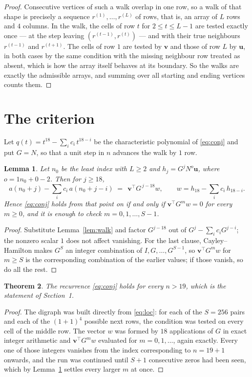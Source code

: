 \documentclass[11pt,a4paper]{article}
\theoremstyle{plain}
\newtheorem{theorem}{Theorem}
\newtheorem{lemma}[theorem]{Lemma}
\theoremstyle{definition}
\begin{document}
\begin{proof}
Consecutive vertices of such a walk overlap in one row, so a walk of that shape is
precisely a sequence $r^{(1)},\dots,r^{(L)}$ of rows, that is, an array of $L$ rows
and $4$ columns. In the walk, the cells of row $t$ for $2\le t\le L-1$ are tested
exactly once --- at the step leaving $(r^{(t-1)},r^{(t)})$ --- and with their true
neighbours $r^{(t-1)}$ and $r^{(t+1)}$. The cells of row $1$ are tested by
$\mathbf{v}$ and those of row $L$ by $\mathbf{u}$, in both cases by the same condition
with the missing neighbour row treated as absent, which is how the array itself behaves at
its boundary. So the walks are exactly the admissible arrays, and summing over all starting
and ending vertices counts them.
\end{proof}

\section{The criterion}

Let $q(t)=t^{18}-\sum_i c_i\,t^{18-i}$ be the characteristic polynomial of
\eqref{eq:conj} and put $G=N$, so that a unit step in $n$ advances the walk by
$1$ row.

\begin{lemma}\label{lem:crit}
Let $n_0$ be the least index with $L\ge2$ and $h_j=G^{j}N^{o}\mathbf{u}$, where
$o=1n_0+0-2$. Then for $j\ge18$,
\[
a(n_0+j)-\sum_i c_i\,a(n_0+j-i)\;=\;\,\mathbf{v}^{\!\top}G^{\,j-18}w,
\qquad w=h_{18}-\sum_i c_i\,h_{18-i} .
\]
Hence \eqref{eq:conj} holds from that point on if and only if
$\mathbf{v}^{\!\top}G^{m}w=0$ for every $m\ge0$, and it is enough to check
$m=0,1,\dots,S-1$.
\end{lemma}

\begin{proof}
Substitute Lemma~\ref{lem:walk} and factor $G^{j-18}$ out of
$G^{j}-\sum_ic_iG^{j-i}$; the nonzero scalar $1$ does not affect
vanishing. For the last clause, Cayley--Hamilton makes $G^{S}$ an integer combination of
$I,G,\dots,G^{S-1}$, so $\mathbf{v}^{\!\top}G^{m}w$ for $m\ge S$ is the corresponding
combination of the earlier values; if those vanish, so do all the rest.
\end{proof}

\begin{theorem}
The recurrence \eqref{eq:conj} holds for every $n>19$, which is the statement of
Section~1.
\end{theorem}

\begin{proof}
The digraph was built directly from \eqref{eq:loc}: for each of the $S=256$ pairs and each
of the $(1+1)^{4}$ possible next rows, the condition was tested on every cell of
the middle row. The vector $w$ was formed by $18$ applications of $G$ in exact integer
arithmetic and $\mathbf{v}^{\!\top}G^{m}w$ evaluated for $m=0,1,\dots$, again exactly.
Every one of those integers vanishes from the index corresponding to $n=19+1$ onwards,
and the run was continued until $S+1$ consecutive zeros had been seen, which by
Lemma~\ref{lem:crit} settles every larger $m$ at once.
\end{proof}
\end{document}
